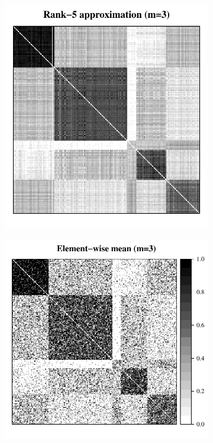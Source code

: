 \begin{figure}
\begin{subfigure}{.45\textwidth}
\end{subfigure}
\begin{subfigure}{.45\textwidth}
  \centering
  \includegraphics[height=\linewidth]{./Figures/SBM_Phat.pdf}
\end{subfigure}%
\begin{subfigure}{.45\textwidth}
  \centering
  \includegraphics[height=\linewidth]{./Figures/SBM_Abar.pdf}

\end{subfigure}
\end{figure}
